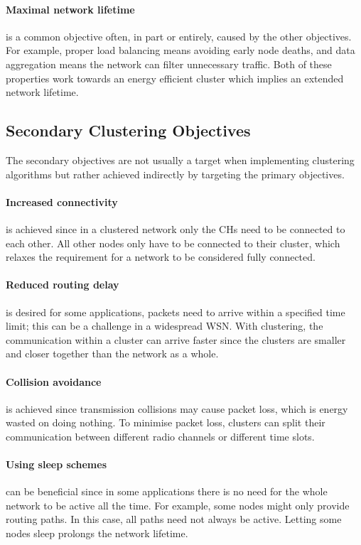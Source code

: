 \paragraph*{Maximal network lifetime} is a common objective often, in part or entirely, caused by the other objectives. For example, proper load balancing means avoiding early node deaths, and data aggregation means the network can filter unnecessary traffic. Both of these properties work towards an energy efficient cluster which implies an extended network lifetime. 

\subsection{Secondary Clustering Objectives}
The secondary objectives are not usually a target when implementing clustering algorithms but rather achieved indirectly by targeting the primary objectives.

\paragraph*{Increased connectivity} is achieved since in a clustered network only the CHs need to be connected to each other. All other nodes only have to be connected to their cluster, which relaxes the requirement for a network to be considered fully connected.

\paragraph*{Reduced routing delay} is desired for some applications, packets need to arrive within a specified time limit; this can be a challenge in a widespread WSN. With clustering, the communication within a cluster can arrive faster since the clusters are smaller and closer together than the network as a whole.

\paragraph*{Collision avoidance} is achieved since transmission collisions may cause packet loss, which is energy wasted on doing nothing. To minimise packet loss, clusters can split their communication between different radio channels or different time slots.

\paragraph*{Using sleep schemes} can be beneficial since in some applications there is no need for the whole network to be active all the time. For example, some nodes might only provide routing paths. In this case, all paths need not always be active. Letting some nodes sleep prolongs the network lifetime.


